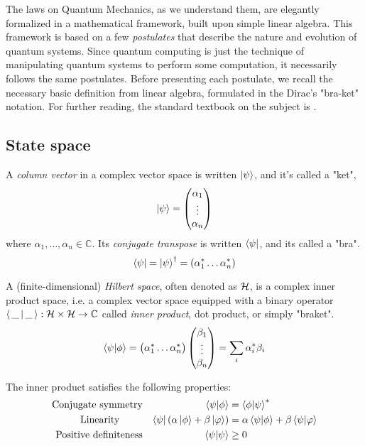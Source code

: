 
The laws on Quantum Mechanics, as we understand them, are elegantly formalized in a mathematical framework, built upon simple linear algebra. This framework is based on a few \textit{postulates} that describe the nature and evolution of quantum systems. Since quantum computing is just the technique of manipulating quantum systems to perform some computation, it necessarily follows the same postulates. Before presenting each postulate, we recall the necessary basic definition from linear algebra, formulated in the Dirac's "bra-ket" notation. For further reading, the standard textbook on the subject is \cite{nielsenQuantumComputationQuantum2010}.


\subsection{State space}

A \textit{column vector} in a complex vector space is written $\ket{\psi}$, and it's called a "ket",
\[ \ket{\psi} = \begin{pmatrix}
		\alpha_1\\
		\vdots\\
		\alpha_n
\end{pmatrix}
\]
where $\alpha_1, \ldots,  \alpha_n \in \mathbb{C}$. Its \textit{conjugate transpose} is written $\bra{\psi}$, and its called a "bra".
	\[
		\bra{\psi} = \ket{\psi}^\dagger = (\alpha_1^* \ldots \alpha_n^*)
	\]

A (finite-dimensional) \textit{Hilbert space}, often denoted as $\cal{H}$, is a complex inner product space, i.e. a complex vector space equipped with a binary operator $\braket{  \,\_\, |\, \_\, }: \mathcal{H} \times \mathcal{H} \rightarrow \mathbb{C}$ called \textit{inner product}, dot product, or simply "braket".
\[
	\braket{\psi | \phi} = 
	\begin{pmatrix}
	\alpha_1^* \ldots \alpha_n^*
	\end{pmatrix}\begin{pmatrix}
	\beta_1 \\
	\vdots \\
	\beta_n
	\end{pmatrix} = 
	\sum_i \alpha_i^*\beta_i
\]

The inner product satisfies the following properties:
\begin{align*}
\text{Conjugate symmetry} & &  \braket{\psi | \phi} &= \braket{\phi | \psi}^* \\
\text{Linearity \quad\quad} & & \bra{\psi} (\alpha\ket{\phi} + \beta\ket{\varphi}) &= \alpha\braket{\psi | \phi} + \beta\braket{\psi | \varphi}\\
\text{Positive definiteness} & & \braket{\psi | \psi} &\geq 0
\end{align*}

